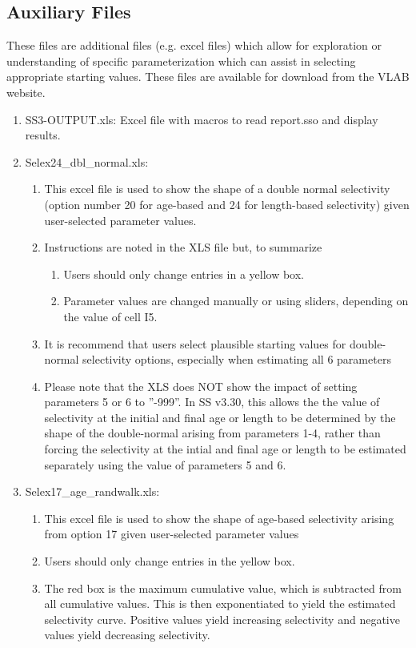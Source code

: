 	\subsection{Auxiliary Files}
	These files are additional files (e.g. excel files) which allow for exploration or understanding of specific parameterization which can assist in selecting appropriate starting values.  These files are available for download from the VLAB website. 
	\begin{enumerate}
		\item SS3-OUTPUT.xls:   Excel file with macros to read report.sso and display results.
		\item Selex24\_dbl\_normal.xls:
		\begin{enumerate}
			\item This excel file is used to show the shape of a double normal selectivity (option number 20 for age-based and 24 for length-based selectivity) given user-selected parameter values.
			\item Instructions are noted in the XLS file but, to summarize
			\begin{enumerate}
				\item Users should only change entries in a yellow box. 
				\item Parameter values are changed manually or using sliders, depending on the value of cell I5.
			\end{enumerate}
			\item It is recommend that users select plausible starting values for double-normal selectivity options, especially when estimating all 6 parameters
			\item Please note that the XLS does NOT show the impact of setting parameters 5 or 6 to ''-999''.  In SS v3.30, this allows the the value of selectivity at the initial and final age or length to be determined by the shape of the double-normal arising from parameters 1-4, rather than forcing the selectivity at the intial and final age or length to be estimated separately using the value of parameters 5 and 6. 
		\end{enumerate}
		\item Selex17\_age\_randwalk.xls:
		\begin{enumerate}
			\item This excel file is used to show the shape of age-based selectivity arising from option 17 given user-selected parameter values
			\item Users should only change entries in the yellow box.
			\item The red box is the maximum cumulative value, which is subtracted from all cumulative values.  This is then exponentiated to yield the estimated selectivity curve.  Positive values yield increasing selectivity and negative values yield decreasing selectivity.

\end{enumerate}
\end{enumerate}
